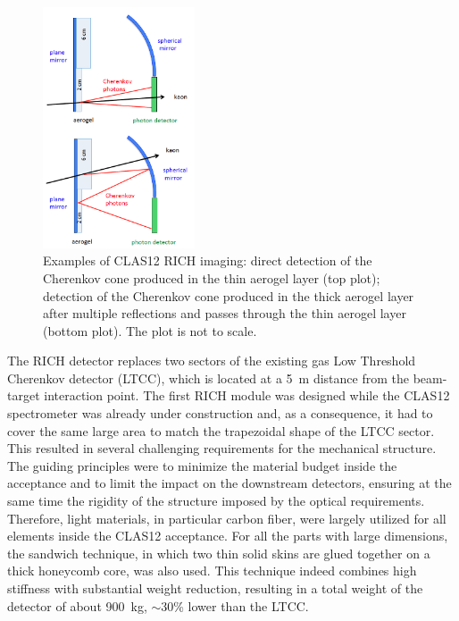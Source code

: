 \documentclass[5p,times,twocolumn]{elsarticle}
\begin{document}
\begin{figure}
\begin{center}
\includegraphics[width=0.40\textwidth]{Mirror_scheme3.png}
\caption{Examples of CLAS12 RICH imaging: direct detection of the Cherenkov cone produced in the thin aerogel layer
  (top plot); detection of the Cherenkov cone produced in the thick aerogel layer after multiple reflections and passes
  through the thin aerogel layer (bottom plot). The plot is not to scale.}
\label{Fig:RICHsketch}
\end{center}
\end{figure}


The RICH detector replaces two sectors of the existing gas Low Threshold Cherenkov detector (LTCC), which is located
at a 5~m distance from the beam-target interaction point. The first RICH module was designed while the CLAS12 spectrometer was
already under construction and,  as a consequence, it had to cover the same large area to match the trapezoidal shape of
the LTCC sector. This resulted in several challenging requirements for the mechanical structure. The guiding principles
were to minimize the material budget inside the acceptance and to limit the impact on the downstream detectors,
ensuring at the same time the rigidity of the structure imposed by the optical requirements. Therefore, light materials,
in particular carbon fiber, were largely utilized for all elements inside the CLAS12 acceptance. For all the parts with
large dimensions, the sandwich technique, in which two thin solid skins are glued together on a thick honeycomb core, was
also used. This technique indeed combines high stiffness with substantial weight reduction, resulting in a total weight of
the detector of about 900~kg, $\sim$30\% lower than the LTCC.
\end{document}
